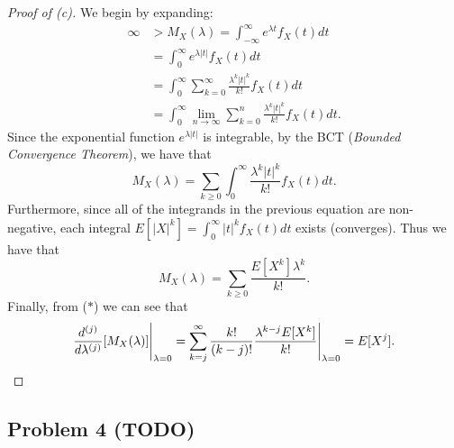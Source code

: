 \documentclass[12pt,reqno]{article}
\renewcommand{\emph}[1]{\textit{#1}}
\theoremstyle{plain}
\theoremstyle{definition}
\begin{document}
\begin{proof}[Proof of (c)] 
We begin by expanding:
\begin{align*} 
\infty & > M_X(\lambda) = \int_{-\infty}^{\infty} e^{\lambda t} f_X(t) dt \\ 
     & = \int_0^{\infty} e^{\lambda |t|} f_X(t) dt \\ 
     & = \int_0^{\infty} \sum_{k=0}^{\infty} \frac{\lambda^k |t|^k}{k!} 
     f_X(t) dt \\ 
     & = \int_0^{\infty} \lim_{n \rightarrow \infty} \sum_{k=0}^n 
     \frac{\lambda^k |t|^k}{k!} f_X(t) dt. 
\end{align*} 
Since the exponential function $e^{\lambda |t|}$ is integrable, by the 
BCT (\emph{Bounded Convergence Theorem}), we have that 
\[
\tag{$\ast$} 
M_X(\lambda) = \sum_{k \geq 0} \int_0^{\infty} \frac{\lambda^k |t|^k}{k!} 
     f_X(t) dt. 
\]
Furthermore, since all of the integrands in the previous equation are 
non-negative, each integral $E[|X|^k] = \int_0^{\infty} |t|^k f_X(t) dt$ 
exists (converges). Thus we have that 
\[
M_X(\lambda) = \sum_{k \geq 0} \frac{E[X^k] \lambda^k}{k!}. 
\]
Finally, from ($\ast$) we can see that 
\[
\frac{d^{(j)}}{d\lambda^{(j)}}[M_X(\lambda)] \Biggr\rvert_{\lambda=0} = 
     \sum_{k=j}^{\infty} \frac{k!}{(k-j)!} \frac{\lambda^{k-j} E[X^k]}{k!} 
     \Biggr\rvert_{\lambda=0} = E[X^j].
     \qedhere
\]
\end{proof} 

\subsection{Problem 4 (TODO)}
\end{document}
